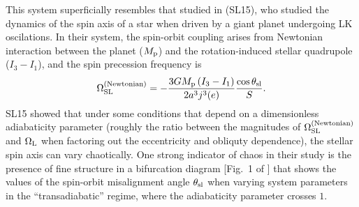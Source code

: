 \documentclass[
        twocolumn,
        twocolappendix
    ]{aastex63}
\newcommand*{\p}[1]{\left(#1\right)}
\begin{document}
This system superficially resembles that studied in \citet{storch} (SL15), who
studied the dynamics of the spin axis of a star when driven by a giant planet
undergoing LK oscilations. In their system, the spin-orbit coupling arises from
Newtonian interaction between the planet ($M_{\rm p}$) and the rotation-induced
stellar quadrupole ($I_3-I_1$), and the spin precession frequency is
\begin{equation}
    \Omega_{\rm SL}^{\rm (Newtonian)} = -\frac{3GM_{\rm p} \p{I_3 - I_1}}{
        2a^3j^3(e)}\frac{\cos \theta_{\rm sl}}{S}.
\end{equation}
SL15 showed that under some conditions that depend on a dimensionless adiabaticity
parameter (roughly the ratio between the magnitudes of $\Omega_{\rm SL}^{\rm
(Newtonian)}$ and $\Omega_{\rm L}$ when factoring out the eccentricity and
obliquty dependence), the stellar spin axis can vary chaotically. One
strong indicator of chaos in their study is the presence of fine structure in a
bifurcation diagram [Fig.~1 of \citet{storch}] that shows the values of the
spin-orbit misalignment angle $\theta_{\rm sl}$ when varying system
parameters in the ``transadiabatic'' regime, where the adiabaticity parameter
crosses $1$.
\end{document}
